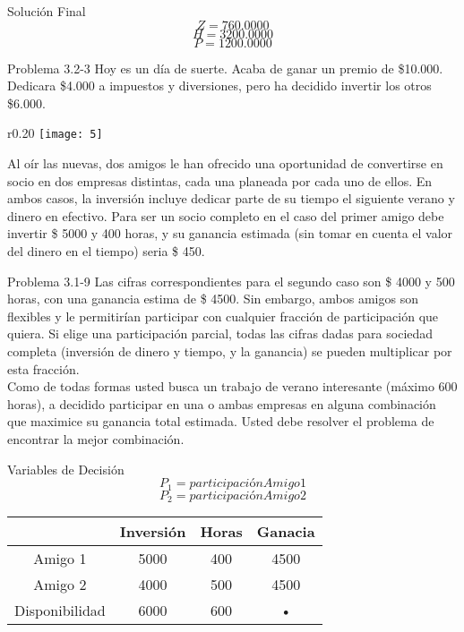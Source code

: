 \documentclass{beamer}
\begin{document}
\begin{frame}[fragile]{Solución Final}
\[Z = 760.0000\]
\[H = 3 200.0000\]
\[P = 1 200.0000\]
\end{frame}

\begin{frame}[t,fragile]{Problema 3.2-3}
Hoy es un día de suerte. Acaba de ganar un premio de \$10.000. Dedicara \$4.000 a impuestos y diversiones, pero ha decidido invertir los otros \$6.000. \begin{wrapfigure}{r}{0.20\textwidth}
    \centering
    \texttt{[image: 5]}
\end{wrapfigure}Al oír las nuevas, dos amigos le han ofrecido una oportunidad de convertirse en socio en dos empresas distintas, cada una planeada por cada uno de ellos. En ambos casos, la inversión incluye dedicar parte de su tiempo el siguiente verano y dinero en efectivo. Para ser un socio completo en el caso del primer amigo debe invertir \$ 5000 y 400 horas, y su ganancia estimada (sin tomar en cuenta el valor del dinero en el tiempo) seria \$ 450. 

\end{frame}
\begin{frame}[t,fragile]{Problema  3.1-9}
Las cifras correspondientes para el segundo caso son \$ 4000 y 500 horas, con una ganancia estima de \$ 4500. Sin embargo, ambos amigos son flexibles y le permitirían participar con cualquier fracción de participación que quiera. Si elige una participación parcial, todas las cifras dadas para sociedad completa (inversión de dinero y tiempo, y la ganancia) se pueden multiplicar por esta fracción. \\
Como de todas formas usted busca un trabajo de verano interesante (máximo 600 horas), a decidido participar en una o ambas empresas en alguna combinación que maximice su ganancia total estimada. Usted debe resolver el problema de encontrar la mejor combinación.
\end{frame}

\begin{frame}[fragile]{Variables de Decisión}
\[P_{1} = participación Amigo 1\]
\[P_{2} = participación Amigo 2\]
\begin{tabular}{|c|c|c|c|}
\hline 
  & Inversión & Horas & Ganacia \\ 
\hline 
Amigo 1 & 5000 & 400 & 4500 \\ 
\hline 
Amigo 2 & 4000 & 500 & 4500 \\ 
\hline 
Disponibilidad & 6000 & 600 & • \\ 
\hline 
\end{tabular} 


\end{frame}
\end{document}
